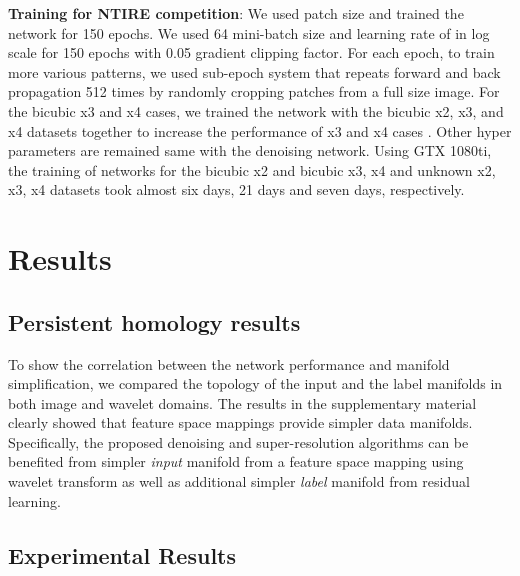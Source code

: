 \documentclass[10pt,twocolumn,letterpaper]{article}
\begin{document}
{\bf Training for NTIRE competition}: 
We used  patch size and trained the network for 150 epochs.
We used 64 mini-batch size and learning rate of  in log scale for 150 epochs with 0.05 gradient clipping factor. For each epoch, to train more various patterns, we used sub-epoch system that repeats forward and back propagation 512 times by randomly cropping patches from a full size image. For the bicubic x3 and x4 cases, we trained the network with the bicubic x2, x3, and x4 datasets together to increase the performance of x3 and x4 cases \cite{kim2015accurate}. Other hyper parameters are remained same with the denoising network. Using GTX 1080ti, the training of networks for the bicubic x2 and bicubic x3, x4 and unknown x2, x3, x4 datasets took almost six days, 21 days and seven days, respectively. 








\section{Results}

\subsection{Persistent homology results}

To show the correlation between the network performance and manifold simplification, we compared the topology of the input and the label manifolds in both image and wavelet domains. 
The results in the supplementary material clearly showed that  feature space mappings  provide simpler data manifolds.
Specifically, the proposed denoising and super-resolution algorithms can be benefited from   simpler \emph{ input} manifold  from a feature space mapping using wavelet transform 
as well as additional simpler {\em label} manifold from residual learning.

\subsection{Experimental Results}
\end{document}
